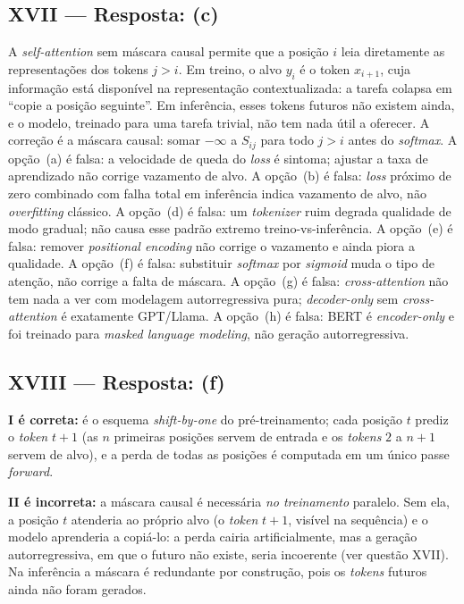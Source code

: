 \documentclass{dlproblemset}
\begin{document}
\subsection*{XVII — Resposta: (c)}
A \textit{self-attention} sem máscara causal permite que a posição $i$ leia diretamente
as representações dos tokens $j > i$. Em treino, o alvo $y_i$ é o token $x_{i+1}$, cuja
informação está disponível na representação contextualizada: a tarefa colapsa em
``copie a posição seguinte''. Em inferência, esses tokens futuros não existem ainda, e o
modelo, treinado para uma tarefa trivial, não tem nada útil a oferecer. A correção é a
máscara causal: somar $-\infty$ a $S_{ij}$ para todo $j > i$ antes do \textit{softmax}.
A opção~(a) é falsa: a velocidade de queda do \textit{loss} é sintoma; ajustar a taxa
de aprendizado não corrige vazamento de alvo.
A opção~(b) é falsa: \textit{loss} próximo de zero combinado com falha total em
inferência indica vazamento de alvo, não \textit{overfitting} clássico.
A opção~(d) é falsa: um \textit{tokenizer} ruim degrada qualidade de modo gradual; não
causa esse padrão extremo treino-vs-inferência.
A opção~(e) é falsa: remover \textit{positional encoding} não corrige o vazamento e
ainda piora a qualidade.
A opção~(f) é falsa: substituir \textit{softmax} por \textit{sigmoid} muda o tipo de
atenção, não corrige a falta de máscara.
A opção~(g) é falsa: \textit{cross-attention} não tem nada a ver com modelagem
autorregressiva pura; \textit{decoder-only} sem \textit{cross-attention} é exatamente
GPT/Llama.
A opção~(h) é falsa: BERT é \textit{encoder-only} e foi treinado para \textit{masked
language modeling}, não geração autorregressiva.

\subsection*{XVIII — Resposta: (f)}
\textbf{I é correta:} é o esquema \textit{shift-by-one} do pré-treinamento; cada posição
$t$ prediz o \textit{token} $t{+}1$ (as $n$ primeiras posições servem de entrada e os
\textit{tokens} $2$ a $n{+}1$ servem de alvo), e a perda de todas as posições é computada
em um único passe \textit{forward}.

\textbf{II é incorreta:} a máscara causal é necessária \emph{no treinamento}
paralelo. Sem ela, a posição $t$ atenderia ao próprio alvo (o \textit{token} $t{+}1$,
visível na sequência) e o modelo aprenderia a copiá-lo: a perda cairia artificialmente,
mas a geração autorregressiva, em que o futuro não existe, seria incoerente (ver
questão XVII). Na inferência a máscara é redundante por construção, pois os
\textit{tokens} futuros ainda não foram gerados.
\end{document}
